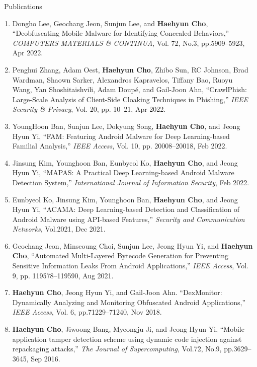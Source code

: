 \documentclass{resume} %
\begin{document}
\begin{rSection}{\faGenderless~Publications}
\begin{enumerate}[leftmargin=0pt]
		\item Dongho Lee, Geochang Jeon, Sunjun Lee, and \textbf{Haehyun Cho},
		``Deobfuscating Mobile Malware for Identifying Concealed Behaviors,''
		\emph{COMPUTERS MATERIALS \& CONTINUA}, 
		Vol. 72, No.3, pp.5909--5923, Apr 2022.
		
		\item Penghui Zhang, Adam Oest, \textbf{Haehyun Cho}, Zhibo Sun, RC Johnson, Brad Wardman, Shaown Sarker, Alexandros Kapravelos, Tiffany Bao, Ruoyu Wang, Yan Shoshitaishvili, Adam Doup\'e, and Gail-Joon Ahn,
		``CrawlPhish: Large-Scale Analysis of Client-Side Cloaking Techniques in Phishing,''
		\emph{IEEE Security \& Privacy}, 
		Vol. 20, pp. 10--21, Apr 2022. 

		\item YoungHoon Ban, Sunjun Lee, Dokyung Song, \textbf{Haehyun Cho}, and Jeong Hyun Yi,
		``FAM: Featuring Android Malware for Deep Learning-based Familial Analysis,'' 
		\emph{IEEE Access}, 
		Vol. 10, pp. 20008--20018, Feb 2022.
		
		\item Jinsung Kim, Younghoon Ban, Eunbyeol Ko, \textbf{Haehyun Cho}, and Jeong Hyun Yi,
		``MAPAS: A Practical Deep Learning-based Android Malware Detection System,''
		\emph{International Journal of Information Security}, 
		Feb 2022.
		
		\item Eunbyeol Ko, Jinsung Kim, Younghoon Ban, \textbf{Haehyun Cho}, and Jeong Hyun Yi, 
		``ACAMA: Deep Learning-based Detection and Classification of Android Malware using API-based Features,''
		\emph{Security and Communication Networks}, 
		Vol.2021, Dec 2021.
		
		\item Geochang Jeon, Minseoung Choi, Sunjun Lee, Jeong Hyun Yi, and \textbf{Haehyun Cho},
		``Automated Multi-Layered Bytecode Generation for Preventing Sensitive Information Leaks From Android Applications,''
		\emph{IEEE Access}, 
		Vol. 9, pp. 119578--119590, Aug 2021.
		
		\item \textbf{Haehyun Cho}, Jeong Hyun Yi, and Gail-Joon Ahn.
        ``DexMonitor: Dynamically Analyzing and Monitoring Obfuscated Android Applications,'' 
        \emph{IEEE Access},
        Vol. 6, pp.71229--71240, Nov 2018.

		\item \textbf{Haehyun Cho}, Jiwoong Bang, Myeongju Ji, and Jeong Hyun Yi, 
		``Mobile application tamper detection scheme using dynamic code injection against repackaging attacks,'' 
		\emph{The Journal of Supercomputing}, 
		Vol.72, No.9, pp.3629--3645, Sep 2016.


\end{enumerate}
\end{rSection}
\end{document}
